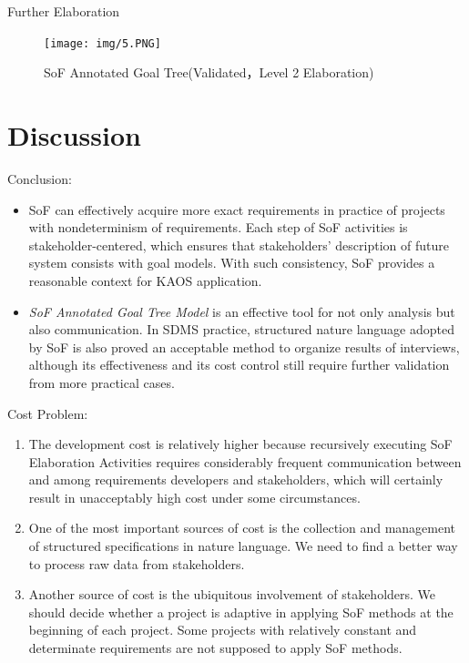 ﻿\documentclass{beamer}
\begin{document}
\begin{frame} {Further Elaboration}
  \begin{figure}
    \texttt{[image: img/5.PNG]}
    \caption{SoF Annotated Goal Tree(Validated，Level 2 Elaboration)}
  \end{figure}
\end{frame}    

\section{Discussion}
\begin{frame}{Conclusion:} %
  \small{
  \begin{itemize}
  \item
    SoF can effectively acquire more exact requirements in practice of projects with nondeterminism of requirements. Each step of SoF activities is stakeholder-centered, which ensures that stakeholders' description of future system consists with goal models. With such consistency, SoF provides a reasonable context for KAOS application.\pause
  \item
    \emph{SoF Annotated Goal Tree Model} is an effective tool for not only analysis but also communication. In SDMS practice, structured nature language adopted by SoF is also proved an acceptable method to organize results of interviews, although its effectiveness and its cost control still require further validation from more practical cases.\pause
  \end{itemize}
  }
\end{frame}  

\begin{frame}{Cost Problem:}
  \small{
  \begin{enumerate}
  \item The development cost is relatively higher because recursively executing SoF Elaboration Activities requires considerably frequent communication between and among requirements developers and stakeholders, which will certainly result in unacceptably high cost under some circumstances.\pause
  \item
    One of the most important sources of cost is the collection and management of structured specifications in nature language. We need to find a better way to process raw data from stakeholders.\pause
  \item 
    Another source of cost is the ubiquitous involvement of stakeholders. We should decide whether a project is adaptive in applying SoF methods at the beginning of each project. Some projects with relatively constant and determinate requirements are not supposed to apply SoF methods.\pause
  \end{enumerate}
  }
\end{frame}
\end{document}

